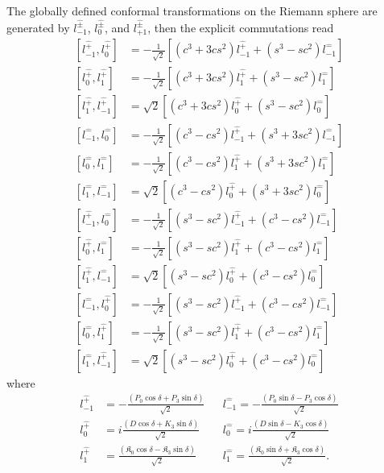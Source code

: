 \documentclass[%
 reprint,
superscriptaddress,
 amsmath,amssymb,
 aps,
]{revtex4-2}
\begin{document}
The globally defined conformal transformations on the Riemann sphere are generated by $l^{\hat{\pm}}_{-1}$, $l^{\hat{\pm}}_{0}$, and $l^{\hat{\pm}}_{+1}$, then the explicit commutations read
\begin{subequations}
\begin{align}
    [l^{\hat{+}}_{-1},l^{\hat{+}}_{0}]&=-\frac{1}{\sqrt{2}}[(c^{3}+3cs^{2})l^{\hat{+}}_{-1}+(s^{3}-sc^{2})l^{\hat{-}}_{-1}]\\
    [l^{\hat{+}}_{0},l^{\hat{+}}_{1}]&=-\frac{1}{\sqrt{2}}[(c^{3}+3cs^{2})l^{\hat{+}}_{1}+(s^{3}-sc^{2})l^{\hat{-}}_{1}]\\
    [l^{\hat{+}}_{1},l^{\hat{+}}_{-1}]&=\sqrt{2}[(c^{3}+3cs^{2})l^{\hat{+}}_{0}+(s^{3}-sc^{2})l^{\hat{-}}_{0}]\\
    [l^{\hat{-}}_{-1},l^{\hat{-}}_{0}]&=-\frac{1}{\sqrt{2}}[(c^{3}-cs^{2})l^{\hat{+}}_{-1}+(s^{3}+3sc^{2})l^{\hat{-}}_{-1}]\\
    [l^{\hat{-}}_{0},l^{\hat{-}}_{1}]&=-\frac{1}{\sqrt{2}}[(c^{3}-cs^{2})l^{\hat{+}}_{1}+(s^{3}+3sc^{2})l^{\hat{-}}_{1}]\\
    [l^{\hat{-}}_{1},l^{\hat{-}}_{-1}]&=\sqrt{2}[(c^{3}-cs^{2})l^{\hat{+}}_{0}+(s^{3}+3sc^{2})l^{\hat{-}}_{0}]\\
    [l^{\hat{+}}_{-1},l^{\hat{-}}_{0}]&=-\frac{1}{\sqrt{2}}[(s^{3}-sc^{2})l^{\hat{+}}_{-1}+(c^{3}-cs^{2})l^{\hat{-}}_{-1}]\\
    [l^{\hat{+}}_{0},l^{\hat{-}}_{1}]&=-\frac{1}{\sqrt{2}}[(s^{3}-sc^{2})l^{\hat{+}}_{1}+(c^{3}-cs^{2})l^{\hat{-}}_{1}]\\
    [l^{\hat{+}}_{1},l^{\hat{-}}_{-1}]&=\sqrt{2}[(s^{3}-sc^{2})l^{\hat{+}}_{0}+(c^{3}-cs^{2})l^{\hat{-}}_{0}]\\
    [l^{\hat{-}}_{-1},l^{\hat{+}}_{0}]&=-\frac{1}{\sqrt{2}}[(s^{3}-sc^{2})l^{\hat{+}}_{-1}+(c^{3}-cs^{2})l^{\hat{-}}_{-1}]\\
    [l^{\hat{-}}_{0},l^{\hat{+}}_{1}]&=-\frac{1}{\sqrt{2}}[(s^{3}-sc^{2})l^{\hat{+}}_{1}+(c^{3}-cs^{2})l^{\hat{-}}_{1}]\\
    [l^{\hat{-}}_{1},l^{\hat{+}}_{-1}]&=\sqrt{2}[(s^{3}-sc^{2})l^{\hat{+}}_{0}+(c^{3}-cs^{2})l^{\hat{-}}_{0}]
\end{align}
\label{interpolating-Witt}
\end{subequations}
where
\begin{align}
    l^{\hat{+}}_{-1}&=-\frac{(P_{0}\cos{\delta}+P_{3}\sin{\delta})}{\sqrt{2}} &&l^{\hat{-}}_{-1}=-\frac{(P_{0}\sin{\delta}-P_{3}\cos{\delta})}{\sqrt{2}}\\
    l^{\hat{+}}_{0}&=i\frac{(D\cos{\delta}+K_{3}\sin{\delta})}{\sqrt{2}} &&l^{\hat{-}}_{0}=i\frac{(D\sin{\delta}-K_{3}\cos{\delta})}{\sqrt{2}}\\
    l^{\hat{+}}_{1}&=\frac{(\mathfrak{K}_{0}\cos{\delta}-\mathfrak{K}_{3}\sin{\delta})}{\sqrt{2}} &&l^{\hat{-}}_{1}=\frac{(\mathfrak{K}_{0}\sin{\delta}+\mathfrak{K}_{3}\cos{\delta})}{\sqrt{2}}.
\end{align}
\end{document}
